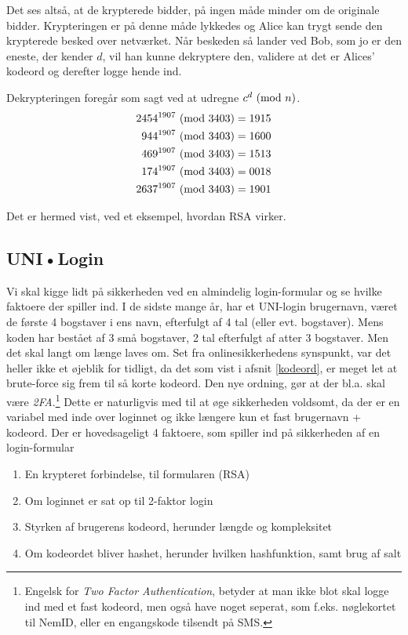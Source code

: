 \begin{eks}
    Det ses altså, at de krypterede bidder, på ingen måde minder om de originale bidder.
    Krypteringen er på denne måde lykkedes og Alice kan trygt sende den krypterede besked over netværket.
    Når beskeden så lander ved Bob, som jo er den eneste, der kender \(d\), vil han kunne dekryptere den, validere at det er Alices' kodeord og derefter logge hende ind.

    Dekrypteringen foregår som sagt ved at udregne \(c^d \ (\mathrm{mod}\ n)\).
    \begin{align*}
        2454^{1907} \ (\mathrm{mod}\ 3403) &= 1915\\
        944^{1907} \ (\mathrm{mod}\ 3403)  &= 1600\\
        469^{1907} \ (\mathrm{mod}\ 3403)  &= 1513\\
        174^{1907} \ (\mathrm{mod}\ 3403)  &= 0018\\
        2637^{1907} \ (\mathrm{mod}\ 3403) &= 1901
    \end{align*}

    Det er hermed vist, ved et eksempel, hvordan RSA virker.
\end{eks}



\subsection{UNI•Login}
Vi skal kigge lidt på sikkerheden ved en almindelig login-formular og se hvilke faktoere der spiller ind.
I de sidste mange år, har et UNI-login brugernavn, været de første 4 bogstaver i ens navn, efterfulgt af 4 tal (eller evt. bogstaver).
Mens koden har bestået af 3 små bogstaver, 2 tal efterfulgt af atter 3 bogstaver.
Men det skal langt om længe laves om. \cite{unilogin}
Set fra onlinesikkerhedens synspunkt, var det heller ikke et øjeblik for tidligt, da det som vist i afsnit \ref{kodeord}, er meget let at brute-force sig frem til så korte kodeord.
Den nye ordning, gør at der bl.a. skal være \emph{2FA}.\footnote{Engelsk for \emph{Two Factor Authentication}, betyder at man ikke blot skal logge ind med et fast kodeord, men også have noget seperat, som f.eks. nøglekortet til NemID, eller en engangskode tilsendt på SMS.}
Dette er naturligvis med til at øge sikkerheden voldsomt, da der er en variabel med inde over loginnet og ikke længere kun et fast brugernavn + kodeord.
Der er hovedsageligt 4 faktoere, som spiller ind på sikkerheden af en login-formular

\begin{enumerate}[noitemsep]
    \item En krypteret forbindelse, til formularen (RSA)
    \item Om loginnet er sat op til 2-faktor login
    \item Styrken af brugerens kodeord, herunder længde og kompleksitet
    \item Om kodeordet bliver hashet, herunder hvilken hashfunktion, samt brug af salt
\end{enumerate}


